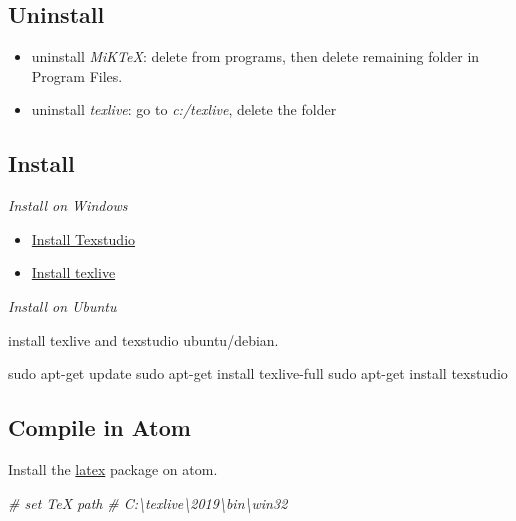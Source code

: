 \documentclass[
]{article}
\newenvironment{Shaded}{\begin{snugshade}}{\end{snugshade}}
\newcommand{\CommentTok}[1]{\textcolor[rgb]{0.56,0.35,0.01}{\textit{#1}}}
\newcommand{\FunctionTok}[1]{\textcolor[rgb]{0.00,0.00,0.00}{#1}}
\newcommand{\NormalTok}[1]{#1}
\providecommand{\tightlist}{%
  \setlength{\itemsep}{0pt}\setlength{\parskip}{0pt}}
\begin{document}
\hypertarget{uninstall}{%
\subsection{Uninstall}\label{uninstall}}

\begin{itemize}
\tightlist
\item
  uninstall \emph{MiKTeX}: delete from programs, then delete remaining
  folder in Program Files.
\item
  uninstall \emph{texlive}: go to \emph{c:/texlive}, delete the folder
\end{itemize}

\hypertarget{install}{%
\subsection{Install}\label{install}}

\emph{Install on Windows}

\begin{itemize}
\tightlist
\item
  \href{https://www.texstudio.org/}{Install Texstudio}
\item
  \href{https://www.tug.org/texlive/acquire-netinstall.html}{Install
  texlive}
\end{itemize}

\emph{Install on Ubuntu}

install texlive and texstudio ubuntu/debian.

\begin{Shaded}
\begin{Highlighting}[]
\FunctionTok{sudo}\NormalTok{ apt-get update}
\FunctionTok{sudo}\NormalTok{ apt-get install texlive-full}
\FunctionTok{sudo}\NormalTok{ apt-get install texstudio}
\end{Highlighting}
\end{Shaded}

\hypertarget{compile-in-atom}{%
\subsection{Compile in Atom}\label{compile-in-atom}}

Install the \href{https://github.com/thomasjo/atom-latex}{latex} package
on atom.

\begin{Shaded}
\begin{Highlighting}[]
\CommentTok{# set TeX path}
\CommentTok{# C:\textbackslash{}texlive\textbackslash{}2019\textbackslash{}bin\textbackslash{}win32}
\end{Highlighting}
\end{Shaded}
\end{document}
